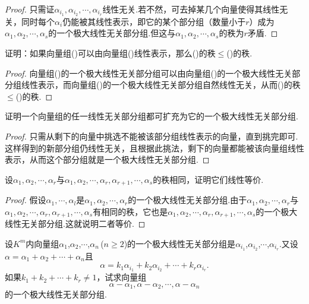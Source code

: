 \begin{proof}
	只需证$\alpha_{i_1},\alpha_{i_2},\cdots,\alpha_{i_r}$线性无关.若不然，可去掉某几个向量使得其线性无关，同时每个$\alpha_i$仍能被其线性表示，即它的某个部分组（数量小于$r$）成为$\alpha_1,\alpha_2,\cdots,\alpha_s$的一个极大线性无关部分组.但这与$\alpha_1,\alpha_2,\cdots,\alpha_s$的秩为$r$矛盾.
\end{proof}
\begin{prob}[16]
	证明：如果向量组(\uppercase\expandafter{})可以由向量组(\uppercase\expandafter{})线性表示，那么(\uppercase\expandafter{})的秩$\le$(\uppercase\expandafter{})的秩.
\end{prob}
\begin{proof}
	向量组(\uppercase\expandafter{})的一个极大线性无关部分组可以由向量组(\uppercase\expandafter{})的一个极大线性无关部分组线性表示，而向量组(\uppercase\expandafter{})的一个极大线性无关部分组自然线性无关，从而(\uppercase\expandafter{})的秩$\le$(\uppercase\expandafter{})的秩.
\end{proof}
\begin{prob}[19]
	证明一个向量组的任一线性无关部分组都可扩充为它的一个极大线性无关部分组.
\end{prob}
\begin{proof}
	只需从剩下的向量中挑选不能被该部分组线性表示的向量，直到挑完即可.这样得到的新部分组仍线性无关，且根据此挑法，剩下的向量都能被该向量组线性表示，从而这个部分组就是一个极大线性无关部分组.
\end{proof}
\begin{prob}[20]
	设$\alpha_1,\alpha_2,\cdots,\alpha_r$与$\alpha_1,\alpha_2,\cdots,\alpha_r,\alpha_{r+1},\cdots,\alpha_s$的秩相同，证明它们线性等价.
\end{prob}
\begin{proof}
	假设$\alpha_1,\cdots,\alpha_l$是$\alpha_1,\alpha_2,\cdots,\alpha_r$的一个极大线性无关部分组.由于$\alpha_1,\alpha_2,\cdots,\alpha_r$与$\alpha_1,\alpha_2,\cdots,\alpha_r,\alpha_{r+1},\cdots,\alpha_s$有相同的秩，它也是$\alpha_1,\alpha_2,\cdots,\alpha_r,\alpha_{r+1},\cdots,\alpha_s$的一个极大线性无关部分组.这就说明二者等价.
\end{proof}
\begin{prob}[23]
	设$K^m$内向量组$\alpha_1$,$\alpha_2$,$\cdots$,$\alpha_n$\,($n\ge2$)的一个极大线性无关部分组是$\alpha_{i_1}$,$\alpha_{i_2}$,$\cdots$,$\alpha_{i_r}$.又设$\alpha=\alpha_1+\alpha_2+\cdots+\alpha_n$且
	\[
		\alpha=k_1\alpha_{i_1}+k_2\alpha_{i_2}+\cdots+k_r\alpha_{i_r}.
	\]
	如果$k_1+k_2+\cdots+k_r\ne1$，试求向量组
	\[
		\alpha-\alpha_1,\alpha-\alpha_2,\cdots,\alpha-\alpha_n
	\]
	的一个极大线性无关部分组.
\end{prob}
